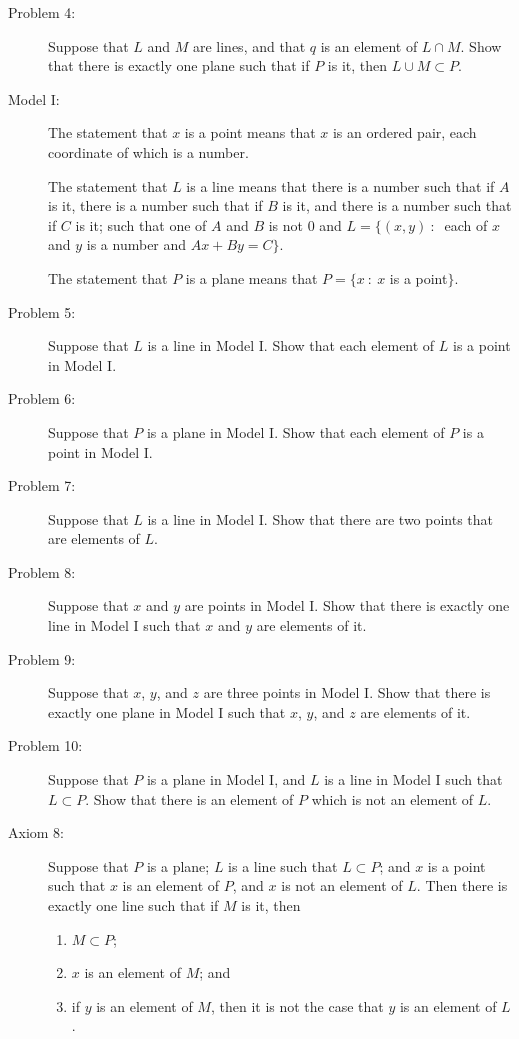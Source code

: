 \documentclass{article}
\begin{document}
\begin{description}
  \item[Problem 4:] Suppose that $L$ and $M$ are lines, and that $q$ is an element of $L \cap M$. Show that there is exactly one plane such that if $P$ is it, then $L \cup M \subset P$.

  \item[Model I:] The statement that $x$ is a point means that $x$ is an ordered pair, each coordinate of which is a number.

    The statement that $L$ is a line means that there is a number such that if $A$ is it, there is a number such that if $B$ is it, and there is a number such that if $C$ is it; such that one of $A$ and $B$ is not $0$ and $L = \{ (x,y)\ :\ $ each of $x$ and $y$ is a number and $Ax + By = C \}$.

    The statement that $P$ is a plane means that $P = \{ x\ :\ x$ is a point$\}$.

  \item[Problem 5:] Suppose that $L$ is a line in Model I. Show that each element of $L$ is a point in Model I.

  \item[Problem 6:] Suppose that $P$ is a plane in Model I. Show that each element of $P$ is a point in Model I.

  \item[Problem 7:] Suppose that $L$ is a line in Model I. Show that there are two points that are elements of $L$.

  \item[Problem 8:] Suppose that $x$ and $y$ are points in Model I. Show that there is exactly one line in Model I such that $x$ and $y$ are elements of it.

  \item[Problem 9:] Suppose that $x$, $y$, and $z$ are three points in Model I. Show that there is exactly one plane in Model I such that $x$, $y$, and $z$ are elements of it.

  \item[Problem 10:] Suppose that $P$ is a plane in Model I, and $L$ is a line in Model I such that $L \subset P$. Show that there is an element of $P$ which is not an element of $L$.

  \item[Axiom 8:] Suppose that $P$ is a plane; $L$ is a line such that $L \subset P$; and $x$ is a point such that $x$ is an element of $P$, and $x$ is not an element of $L$. Then there is exactly one line such that if $M$ is it, then
    \begin{enumerate}[\hspace{1cm}(i.)]
      \item $M \subset P$;
      \item $x$ is an element of $M$; and
      \item if $y$ is an element of $M$, then it is not the case that $y$ is an element of $L$.
    \end{enumerate}


\end{description}
\end{document}

